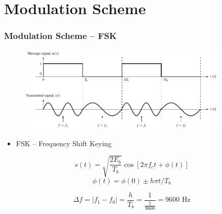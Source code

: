 \section{Modulation Scheme}
\begin{frame} \frametitle{Modulation Scheme -- FSK}
\begin{figure}[htbp]
    \centering
    \includegraphics[width=0.9\textwidth]{img/gfsk_basics}
    \label{fig:gfsk_basics}
\end{figure}
\begin{itemize}
    \item FSK -- Frequency Shift Keying 
\end{itemize}

    \begin{equation}
    \label{eq:msk_mod_output1}
    s(t) = \sqrt{\frac{2E_b}{T_b}} \cos{[2\pi f_c t + \phi(t)]}
    \end{equation}
    \begin{equation}
    \phi(t) = \phi(0) \pm {h\pi t}/{T_b}
    \end{equation}

    \begin{equation}
    \Delta f = |f_1-f_0| = \frac{h}{T_b} = \frac{1}{ \frac{1}{9600} } = 9600 \text{ Hz}
    \end{equation}
\end{frame}

